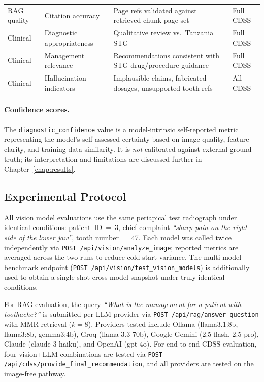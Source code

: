 \documentclass[12pt,a4paper]{report}
\begin{document}
\begin{table}[H]
\begin{tabularx}{\textwidth}{@{}l l X l@{}}
			RAG quality   & Citation accuracy            & Page refs validated against retrieved chunk page set         & Full CDSS \\
			Clinical      & Diagnostic appropriateness   & Qualitative review vs.\ Tanzania STG                         & Full CDSS \\
			Clinical      & Management relevance         & Recommendations consistent with STG drug/procedure guidance  & Full CDSS \\
			Clinical      & Hallucination indicators     & Implausible claims, fabricated dosages, unsupported tooth refs & All CDSS \\
			\bottomrule
		\end{tabularx}
	\end{table}
	
	\paragraph{Confidence scores.}
	The \texttt{diagnostic\_confidence} value is a model-intrinsic
	self-reported metric representing the model's self-assessed certainty
	based on image quality, feature clarity, and training-data similarity.
	It is \emph{not} calibrated against external ground truth; its
	interpretation and limitations are discussed further in Chapter~\ref{chap:results}.
	
	\subsection{Experimental Protocol}
	\label{subsec:protocol}
	
	All vision model evaluations use the same periapical test radiograph
	under identical conditions: patient~ID~=~3, chief complaint
	\textit{``sharp pain on the right side of the lower jaw''}, tooth
	number~=~47.  Each model was called twice independently via
	\texttt{POST /api/vision/analyze\_image}; reported metrics are averaged
	across the two runs to reduce cold-start variance.  The multi-model
	benchmark endpoint (\texttt{POST /api/vision/test\_vision\_models}) is
	additionally used to obtain a single-shot cross-model snapshot under
	truly identical conditions.
	
	For RAG evaluation, the query \textit{``What is the management for a
		patient with toothache?''} is submitted per LLM provider via
	\texttt{POST /api/rag/answer\_question} with MMR retrieval ($k{=}8$).
	Providers tested include Ollama (llama3.1:8b, llama3:8b, gemma3:4b),
	Groq (llama-3.3-70b), Google Gemini (2.5-flash, 2.5-pro), Claude
	(claude-3-haiku), and OpenAI (gpt-4o).  For end-to-end CDSS evaluation,
	four vision+LLM combinations are tested via
	\texttt{POST /api/cdss/provide\_final\_recommendation}, and all providers
	are tested on the image-free pathway.
	
\end{document}
